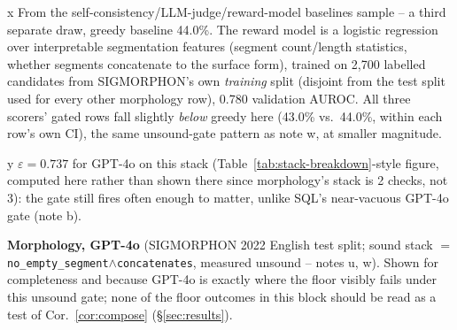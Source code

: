 \documentclass[11pt]{article}
\begin{document}
\begin{table}[t]
\begin{threeparttable}
\begin{tablenotes}[flushleft]
\item[x] From the self-consistency/LLM-judge/reward-model baselines sample -- a third separate draw, greedy baseline 44.0\%. The reward model is a logistic regression over interpretable segmentation features (segment count/length statistics, whether segments concatenate to the surface form), trained on 2{,}700 labelled candidates from SIGMORPHON's own \emph{training} split (disjoint from the test split used for every other morphology row), 0.780 validation AUROC. All three scorers' gated rows fall slightly \emph{below} greedy here (43.0\% vs.\ 44.0\%, within each row's own CI), the same unsound-gate pattern as note w, at smaller magnitude.
\item[y] $\varepsilon=0.737$ for GPT-4o on this stack (Table~\ref{tab:stack-breakdown}-style figure, computed here rather than shown there since morphology's stack is 2 checks, not 3): the gate still fires often enough to matter, unlike SQL's near-vacuous GPT-4o gate (note b).
\end{tablenotes}
\end{threeparttable}
\caption*{\textbf{Morphology, GPT-4o} (SIGMORPHON 2022 English test split; sound stack $=$ \texttt{no\_empty\_segment}$\wedge$\texttt{concatenates}, measured unsound -- notes u, w). Shown for completeness and because GPT-4o is exactly where the floor visibly fails under this unsound gate; none of the floor outcomes in this block should be read as a test of Cor.~\ref{cor:compose} (\S\ref{sec:results}).}

\label{tab:main}
\end{table}
\end{document}
